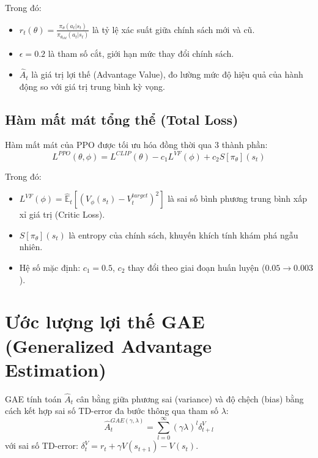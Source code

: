 \documentclass[a4paper, 12pt]{report}
\begin{document}
  Trong đó:
  \begin{itemize}
    \item $r_t(\theta) = \frac{\pi_\theta(a_t|s_t)}{\pi_{\theta_{old}}(a_t|s_t)}$ là tỷ lệ xác suất giữa chính sách mới và cũ.
    \item $\epsilon = 0.2$ là tham số cắt, giới hạn mức thay đổi chính sách.
    \item $\hat{A}_t$ là giá trị lợi thế (Advantage Value), đo lường mức độ hiệu quả của hành động so với giá trị trung bình kỳ vọng.
  \end{itemize}

  \subsection{Hàm mất mát tổng thể (Total Loss)}

  Hàm mất mát của PPO được tối ưu hóa đồng thời qua 3 thành phần:
  \begin{equation}
    L^{PPO}(\theta, \phi) = L^{CLIP}(\theta) - c_1 L^{VF}(\phi) + c_2 S[\pi_\theta](s_t)
    \label{eq:ppo_total}
  \end{equation}

  Trong đó:
  \begin{itemize}
    \item $L^{VF}(\phi) = \hat{\mathbb{E}}_t\left[(V_\phi(s_t) - V^{target}_t)^2\right]$ là sai số bình phương trung bình xấp xỉ giá trị (Critic Loss).
    \item $S[\pi_\theta](s_t)$ là entropy của chính sách, khuyến khích tính khám phá ngẫu nhiên.
    \item Hệ số mặc định: $c_1 = 0.5$, $c_2$ thay đổi theo giai đoạn huấn luyện ($0.05 \to 0.003$).
  \end{itemize}

  \section{Ước lượng lợi thế GAE (Generalized Advantage Estimation)}

  GAE tính toán $\hat{A}_t$ cân bằng giữa phương sai (variance) và độ chệch (bias) bằng cách kết hợp sai số TD-error đa bước thông qua tham số $\lambda$:
  \begin{equation}
    \hat{A}_t^{GAE(\gamma,\lambda)} = \sum_{l=0}^{\infty}(\gamma\lambda)^l \delta_{t+l}^V
    \label{eq:gae}
  \end{equation}
  với sai số TD-error: $\delta_t^V = r_t + \gamma V(s_{t+1}) - V(s_t)$.
\end{document}
